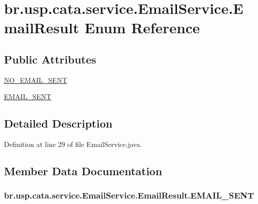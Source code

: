 \hypertarget{enumbr_1_1usp_1_1cata_1_1service_1_1_email_service_1_1_email_result}{\section{br.\+usp.\+cata.\+service.\+Email\+Service.\+Email\+Result Enum Reference}
\label{enumbr_1_1usp_1_1cata_1_1service_1_1_email_service_1_1_email_result}
}
\subsection*{Public Attributes}
\begin{DoxyCompactItemize}
\item 
\hyperlink{enumbr_1_1usp_1_1cata_1_1service_1_1_email_service_1_1_email_result_a5636f9549a9ece7eec4cc3ed691ad137}{N\+O\+\_\+\+E\+M\+A\+I\+L\+\_\+\+S\+E\+N\+T}
\item 
\hyperlink{enumbr_1_1usp_1_1cata_1_1service_1_1_email_service_1_1_email_result_a26f5d2d04b63383323b3c20006d9b573}{E\+M\+A\+I\+L\+\_\+\+S\+E\+N\+T}
\end{DoxyCompactItemize}


\subsection{Detailed Description}


Definition at line 29 of file Email\+Service.\+java.



\subsection{Member Data Documentation}
\hypertarget{enumbr_1_1usp_1_1cata_1_1service_1_1_email_service_1_1_email_result_a26f5d2d04b63383323b3c20006d9b573}{
\subsubsection[{E\+M\+A\+I\+L\+\_\+\+S\+E\+N\+T}]{\setlength{\rightskip}{0pt plus 5cm}br.\+usp.\+cata.\+service.\+Email\+Service.\+Email\+Result.\+E\+M\+A\+I\+L\+\_\+\+S\+E\+N\+T}}\label{enumbr_1_1usp_1_1cata_1_1service_1_1_email_service_1_1_email_result_a26f5d2d04b63383323b3c20006d9b573}


